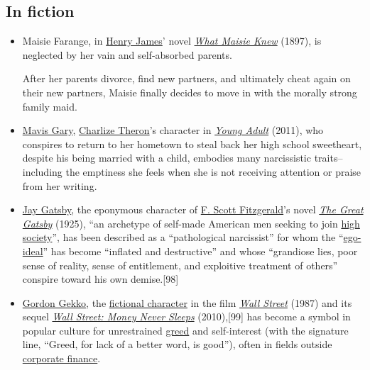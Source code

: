 \documentclass[oneside]{book}
\numberwithin{equation}{section}
\begin{document}
\subsection{In fiction}
\begin{itemize}
    \item Maisie Farange, in \href{https://en.wikipedia.org/wiki/Henry_James}{Henry James}' novel \href{https://en.wikipedia.org/wiki/What_Maisie_Knew}{\textit{What Maisie Knew}} (1897), is neglected by her vain and self-absorbed parents.
        
    After her parents divorce, find new partners, and ultimately cheat again on their new partners, Maisie finally decides to move in with the morally strong family maid.
    \item \href{https://en.wikipedia.org/wiki/Young_Adult_(film)#Cast}{Mavis Gary}, \href{https://en.wikipedia.org/wiki/Charlize_Theron}{Charlize Theron}'s character in \href{https://en.wikipedia.org/wiki/Young_Adult_(film)}{\textit{Young Adult}} (2011), who conspires to return to her hometown to steal back her high school sweetheart, despite his being married with a child, embodies many narcissistic traits--including the emptiness she feels when she is not receiving attention or praise from her writing.
    \item \href{https://en.wikipedia.org/wiki/Jay_Gatsby}{Jay Gatsby}, the eponymous character of \href{https://en.wikipedia.org/wiki/F._Scott_Fitzgerald}{F. Scott Fitzgerald}'s novel \href{https://en.wikipedia.org/wiki/The_Great_Gatsby}{\textit{The Great Gatsby}} (1925), ``an archetype of self-made American men seeking to join \href{https://en.wikipedia.org/wiki/Upper_class}{high society}'', has been described as a ``pathological narcissist'' for whom the ``\href{https://en.wikipedia.org/wiki/Ego_ideal}{ego-ideal}'' has become ``inflated and destructive'' and whose ``grandiose lies, poor sense of reality, sense of entitlement, and exploitive treatment of others'' conspire toward his own demise.[98]
    \item \href{https://en.wikipedia.org/wiki/Gordon_Gekko}{Gordon Gekko}, the \href{https://en.wikipedia.org/wiki/Fictional_character}{fictional character} in the film \href{https://en.wikipedia.org/wiki/Wall_Street_(1987_film)}{\textit{Wall Street}} (1987) and its sequel \href{https://en.wikipedia.org/wiki/Wall_Street:_Money_Never_Sleeps}{\textit{Wall Street: Money Never Sleeps}} (2010),[99] has become a symbol in popular culture for unrestrained \href{https://en.wikipedia.org/wiki/Greed}{greed} and self-interest (with the signature line, ``Greed, for lack of a better word, is good''), often in fields outside \href{https://en.wikipedia.org/wiki/Corporate_finance}{corporate finance}.

\end{itemize}
\end{document}
